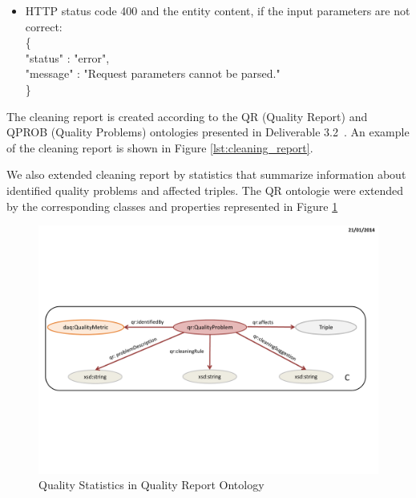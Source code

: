 \begin{description}
\begin{itemize}
\item HTTP status code 400 and the entity content, if the input parameters are not correct:\\ \hspace*{0.2 cm} \{ \\
\hspace*{0.5 cm} "status" : "error",\\
\hspace*{0.5 cm}  "message" : "Request parameters cannot be parsed."\\ \hspace*{0.2 cm} \}

\end{itemize}
The cleaning report is created according to the QR (Quality Report) and QPROB (Quality Problems) ontologies presented in Deliverable 3.2~\cite{d3.2}.
An example of the cleaning report is shown in Figure \ref{lst:cleaning_report}.


We also extended cleaning report by statistics that summarize information about identified quality problems and affected triples. 
The QR ontologie were extended by the corresponding classes and properties represented in Figure \ref{fig:stat}


\begin{figure}[ht!]
\centering
\includegraphics[page=8,trim=1.0cm 1.0cm 1.0cm 1.0cm,clip,width=\textwidth]{figures/CleaningFigures.pdf}
\caption{Quality Statistics in Quality Report Ontology}
\label{fig:stat}
\end{figure}




\end{description}
